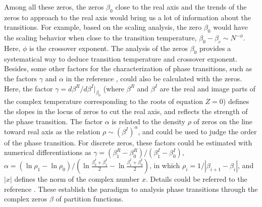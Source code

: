 \documentclass[aps,pre,twocolumn,showpacs,preprintnumbers,amsmath,amssymb]{revtex4-1}
\begin{document}
Among all these zeros, the zeros $\beta_0$ close to the real
axis and the trends of the zeros to approach to the real axis
would bring us a lot of information about the transitions. For
example, based on the scaling analysis, the zero $\beta_0$ would
have the scaling behavior when close to the transition
temperature, $\beta_0-\beta_c\sim N^{-\phi}$. Here, $\phi$ is
the crossover exponent. The analysis of the zeros $\beta_0$
provides a systematical way to deduce transition temperature and
crossover exponent. Besides, some other factors for the
characterization of phase transitions, such as the factors
$\gamma$ and $\alpha$ in the reference \cite{WangJCP03}, could
also be calculated with the zeros. Here, the factor $\gamma=d
\beta^R/d \beta^I|_{\beta_0}$ (where $\beta^R$ and $\beta^I$ are
the real and image parts of the complex temperature
corresponding to the roots of equation $Z=0$) defines the slopes
in the locus of zeros to cut the real axis, and reflects the
strength of the phase transition. The factor $\alpha$ is related
to the density $\rho$ of zeros on the line toward real axis as
the relation $\rho \sim (\beta^I)^{\alpha}$, and could be used
to judge the order of the phase transition. For discrete zeros,
these factors could be estimated with numerical differentiations
as $\gamma=(\beta_1^R-\beta_0^R)/(\beta^I_1-\beta^I_0)$,
$\alpha=(\ln \rho_1-\ln
\rho_0)/(\ln\frac{\beta_2^I+\beta_1^I}{2}-
\ln\frac{\beta_1^I+\beta_0^I}{2})$, in which
$\rho_i=1/|\beta_{i+1}-\beta_i|$, and $|x|$ defines the norm of
the complex number $x$. Details could be referred to the
reference \cite{WangJCP03}. These establish the paradigm to
analysis phase transitions through the complex zeros $\beta$ of
partition functions.

\end{document}
